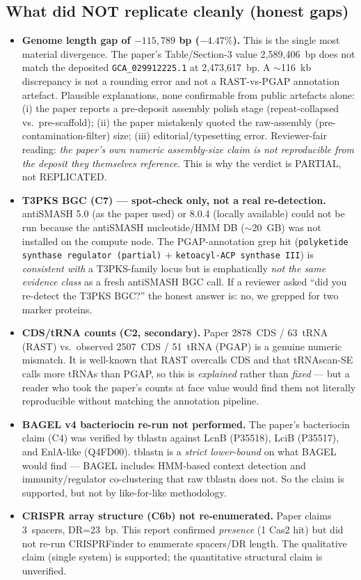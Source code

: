 \documentclass[11pt,a4paper]{article}
\begin{document}
\subsection{What did NOT replicate cleanly (honest gaps)}
\begin{itemize}
    \item \textbf{Genome length gap of $-115{,}789$ bp ($-4.47\%$).} This is the single most material divergence. The paper's Table/Section-3 value 2{,}589{,}406~bp does not match the deposited \texttt{GCA\_029912225.1} at 2{,}473{,}617~bp. A $\sim$116~kb discrepancy is not a rounding error and not a RAST-vs-PGAP annotation artefact. Plausible explanations, none confirmable from public artefacts alone: (i) the paper reports a pre-deposit assembly polish stage (repeat-collapsed vs.\ pre-scaffold); (ii) the paper mistakenly quoted the raw-assembly (pre-contamination-filter) size; (iii) editorial/typesetting error. Reviewer-fair reading: \emph{the paper's own numeric assembly-size claim is not reproducible from the deposit they themselves reference}. This is why the verdict is PARTIAL, not REPLICATED.
    \item \textbf{T3PKS BGC (C7) --- spot-check only, not a real re-detection.} antiSMASH 5.0 (as the paper used) or 8.0.4 (locally available) could not be run because the antiSMASH nucleotide/HMM DB ($\sim$20~GB) was not installed on the compute node. The PGAP-annotation grep hit (\texttt{polyketide synthase regulator (partial)} + \texttt{ketoacyl-ACP synthase III}) is \emph{consistent with} a T3PKS-family locus but is emphatically \emph{not the same evidence class} as a fresh antiSMASH BGC call. If a reviewer asked ``did you re-detect the T3PKS BGC?'' the honest answer is: no, we grepped for two marker proteins.
    \item \textbf{CDS/tRNA counts (C2, secondary).} Paper 2878~CDS / 63~tRNA (RAST) vs.\ observed 2507~CDS / 51~tRNA (PGAP) is a genuine numeric mismatch. It is well-known that RAST overcalls CDS and that tRNAscan-SE calls more tRNAs than PGAP, so this is \emph{explained} rather than \emph{fixed} --- but a reader who took the paper's counts at face value would find them not literally reproducible without matching the annotation pipeline.
    \item \textbf{BAGEL v4 bacteriocin re-run not performed.} The paper's bacteriocin claim (C4) was verified by tblastn against LcnB (P35518), LciB (P35517), and EnlA-like (Q4FD00). tblastn is a \emph{strict lower-bound} on what BAGEL would find --- BAGEL includes HMM-based context detection and immunity/regulator co-clustering that raw tblastn does not. So the claim is supported, but not by like-for-like methodology.
    \item \textbf{CRISPR array structure (C6b) not re-enumerated.} Paper claims 3~spacers, DR=23~bp. This report confirmed \emph{presence} (1 Cas2 hit) but did not re-run CRISPRFinder to enumerate spacers/DR length. The qualitative claim (single system) is supported; the quantitative structural claim is unverified.
\end{itemize}
\end{document}
